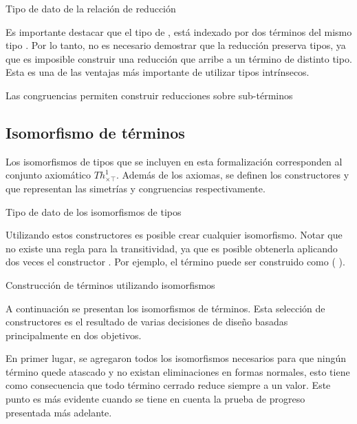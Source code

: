 \begin{codigo}
	Tipo de dato de la relación de reducción
	
\end{codigo}

Es importante destacar que el tipo de \type{$\_\hookrightarrow\_$}, está indexado por dos términos del mismo tipo .
Por lo tanto, no es necesario demostrar que la reducción preserva tipos, ya que es imposible construir una reducción que arribe a un término de distinto tipo.
Esta es una de las ventajas más importante de utilizar tipos intrínsecos.

\begin{example}
	Las congruencias permiten construir reducciones sobre sub-términos
\end{example}

\subsection{Isomorfismo de términos}

Los isomorfismos de tipos que se incluyen en esta formalización corresponden al conjunto axiomático $Th^1_{\times\top}$.
Además de los axiomas, se definen los constructores  y  que representan las simetrías y congruencias respectivamente.

\begin{codigo}
	Tipo de dato de los isomorfismos de tipos
	
\end{codigo}
Utilizando estos constructores es posible crear cualquier isomorfismo.
Notar que no existe una regla para la transitividad, ya que es posible obtenerla aplicando dos veces el constructor \const{$[\_]\equiv\_$}.
Por ejemplo, el término \const{[ trans}   \const{]$\equiv$}  puede ser construido como \const{[}  \const{]$\equiv$} (\const{[}  \const{]$\equiv$} ).

\begin{example}
	Construcción de términos utilizando isomorfismos
\end{example}

A continuación se presentan los isomorfismos de términos.
Esta selección de constructores es el resultado de varias decisiones de diseño basadas principalmente en dos objetivos.

En primer lugar, se agregaron todos los isomorfismos necesarios para que ningún término quede atascado y no existan eliminaciones en formas normales, esto tiene como consecuencia que todo término cerrado reduce siempre a un valor.
Este punto es más evidente cuando se tiene en cuenta la prueba de progreso presentada más adelante.

